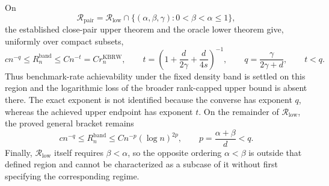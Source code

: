 On
\[
\mathcal R_{\mathrm{pair}}
=\mathcal R_{\mathrm{low}}\cap
\{(\alpha,\beta,\gamma):0<\beta<\alpha\leq1\},
\]
the established close-pair upper theorem and the oracle lower theorem give,
uniformly over compact subsets,
\[
c n^{-q}\leq R_n^{\mathrm{band}}
\leq C n^{-t}=C r_n^{\mathrm{KBRW}},
\qquad
t=\left(1+\frac d{2\gamma}+\frac d{4s}\right)^{-1},
\qquad
q=\frac{\gamma}{2\gamma+d},
\qquad t<q.
\]
Thus benchmark-rate achievability under the fixed density band is settled on
this region and the logarithmic loss of the broader rank-capped upper bound is
absent there.  The exact exponent is not identified because the converse has
exponent \(q\), whereas the achieved upper endpoint has exponent \(t\).
On the remainder of \(\mathcal R_{\mathrm{low}}\), the proved general
bracket remains
\[
c n^{-q}\leq R_n^{\mathrm{band}}
\leq Cn^{-p}(\log n)^{2p},
\qquad p=\frac{\alpha+\beta}{d}<q.
\]
Finally, \(\mathcal R_{\mathrm{low}}\) itself requires \(\beta<\alpha\), so
the opposite ordering \(\alpha<\beta\) is outside that defined region and
cannot be characterized as a subcase of it without first specifying the
corresponding regime.
